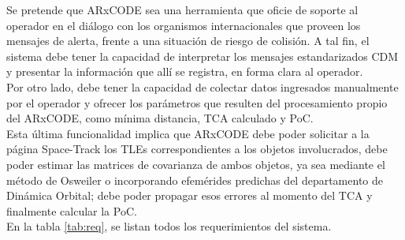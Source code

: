 Se pretende que ARxCODE sea una herramienta que oficie de soporte al operador en el di\'alogo con los organismos internacionales que proveen los mensajes de alerta, frente a una situaci\'on de riesgo de colisi\'on. A tal fin, el sistema debe tener la capacidad de interpretar los mensajes estandarizados CDM y presentar la informaci\'on que all\'i se registra, en forma clara al operador.\\
Por otro lado, debe tener la capacidad de colectar datos ingresados manualmente por el operador y ofrecer los par\'ametros que resulten del procesamiento propio del ARxCODE, como m\'inima distancia, TCA calculado y PoC.\\
Esta \'ultima funcionalidad implica que ARxCODE debe poder solicitar a la p\'agina Space-Track los TLEs correspondientes a los objetos involucrados, debe poder estimar las matrices de covarianza de ambos objetos, ya sea mediante el m\'etodo de Osweiler o incorporando efem\'erides predichas del departamento de Din\'amica Orbital; debe poder propagar esos errores al momento del TCA y finalmente calcular la PoC.\\
En la tabla \ref{tab:req}, se listan todos los requerimientos del sistema.\\

